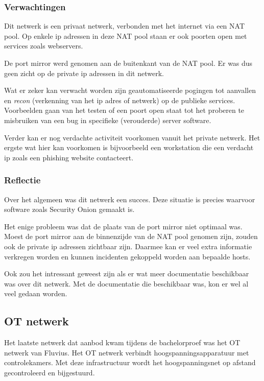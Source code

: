 \documentclass[a4paper,12pt]{report}
\begin{document}
\subsubsection{Verwachtingen}
Dit netwerk is een privaat netwerk, verbonden met het internet via een NAT pool.
Op enkele ip adressen in deze NAT pool staan er ook poorten open met services zoals webservers.

De port mirror werd genomen aan de buitenkant van de NAT pool.
Er was dus geen zicht op de private ip adressen in dit netwerk.

Wat er zeker kan verwacht worden zijn geautomatiseerde pogingen tot aanvallen en \emph{recon} (verkenning van het ip adres of netwerk) op de publieke services.
Voorbeelden gaan van het testen of een poort open staat tot het proberen te misbruiken van een bug in specifieke (verouderde) server software.

Verder kan er nog verdachte activiteit voorkomen vanuit het private netwerk.
Het ergste wat hier kan voorkomen is bijvoorbeeld een workstation die een verdacht ip zoals een phishing website contacteert.


\subsubsection{Reflectie}

Over het algemeen was dit netwerk een succes.
Deze situatie is precies waarvoor software zoals Security Onion gemaakt is.

Het enige probleem was dat de plaats van de port mirror niet optimaal was.
Moest de port mirror aan de binnenzijde van de NAT pool genomen zijn, zouden ook de private ip adressen zichtbaar zijn.
Daarmee kan er veel extra informatie verkregen worden en kunnen incidenten gekoppeld worden aan bepaalde hosts.

Ook zou het intressant geweest zijn als er wat meer documentatie beschikbaar was over dit netwerk.
Met de documentatie die beschikbaar was, kon er wel al veel gedaan worden.

\subsection{OT netwerk}
Het laatste netwerk dat aanbod kwam tijdens de bachelorproef was het OT netwerk van Fluvius.
Het OT netwerk verbindt hoogspanningsapparatuur met controlekamers.
Met deze infrastructuur wordt het hoogspanningsnet op afstand gecontroleerd en bijgestuurd.
\end{document}
